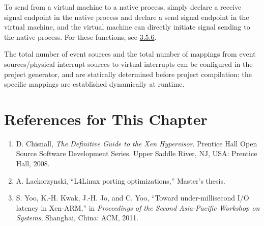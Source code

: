 To send from a virtual machine to a native process, simply declare a receive signal endpoint in the native process and declare a send signal endpoint in the virtual machine, and the virtual machine can directly initiate signal sending to the native process. For these functions, see \protect\hyperref[subsec:3-5-6]{3.5.6}.

The total number of event sources and the total number of mappings from event sources/physical interrupt sources to virtual interrupts can be configured in the project generator, and are statically determined before project compilation; the specific mappings are established dynamically at runtime.

\section{References for This Chapter}\label{sec:2-3}

\begin{enumerate}
\def\labelenumi{{[}\arabic{enumi}{]}}
\item
  \protect{}\label{cite:2-1}
  D. Chisnall, \textit{The Definitive Guide to the Xen Hypervisor}.
  Prentice Hall Open Source Software Development Series. Upper Saddle
  River, NJ, USA: Prentice Hall, 2008.
\item
  \protect{}\label{cite:2-2}
  A. Lackorzynski, ``L4Linux porting optimizations,'' Master's thesis.
\item
  \protect{}\label{cite:2-3}
  S. Yoo, K.-H. Kwak, J.-H. Jo, and C. Yoo, ``Toward under-millisecond
  I/O latency in Xen-ARM,'' in \textit{Proceedings of the Second
  Asia-Pacific Workshop on Systems}, Shanghai, China: ACM, 2011.
\end{enumerate}

